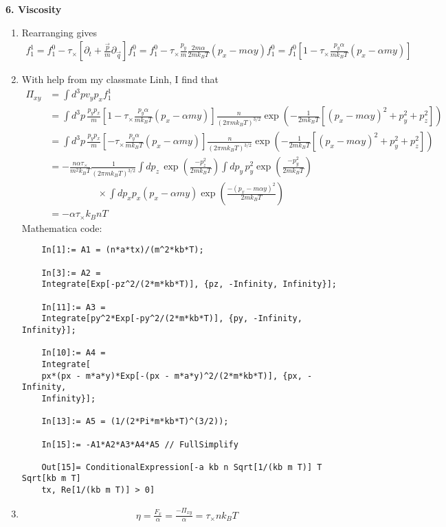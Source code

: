 \documentclass{article}
\theoremstyle{definition}
\newcommand{\p}{\partial}
\newcommand{\al}{\alpha}
\newcommand{\f}[2]{\frac{#1}{#2}}
\newcommand{\lp}{\left(}
\newcommand{\rp}{\right)}
\newcommand{\lb}{\left[}
\newcommand{\rb}{\right]}
\begin{document}
\noindent \textbf{6. Viscosity}

\begin{enumerate}[label=(\alph*)]
	\item Rearranging gives
	\begin{align*}
	\boxed{f_1^1} = f_1^0 - \tau_\times \lb \p_t + \f{\vec{p}}{m} \p_{\vec{q}} \rb f_1^0 = f_1^0 - \tau_\times \f{p_y}{m} \f{2m\al}{2mk_B T}(p_x - m\al y) f_1^0 = \boxed{f_1^0\lb 1 - \tau_\times \f{p_y \al}{ mk_B T}(p_x - \al m y) \rb}
	\end{align*}
	
	\item With help from my classmate Linh, I find that
	\begin{align*}
	\boxed{\Pi_{xy}} 
	&= \int d^3 p v_y p_x f_1^1 \\
	&= \int d^3 p \, \f{p_yp_x}{m} \lb 1 - \tau_\times \f{p_y \al}{ mk_B T}(p_x - \al m y) \rb \f{n}{(2\pi m k_B T)^{3/2}} \exp\lp -\f{1}{2mk_BT }\lb (p_x - m\al y)^2 + p_y^2 + p_z^2 \rb \rp \\
	&= \int d^3 p \, \f{p_yp_x}{m} \lb- \tau_\times \f{p_y \al}{ mk_B T}(p_x - \al m y) \rb \f{n}{(2\pi m k_B T)^{3/2}} \exp\lp -\f{1}{2mk_BT }\lb (p_x - m\al y)^2 + p_y^2 + p_z^2 \rb \rp \\
	&= -\f{n\al \tau_\times }{m^2 k_BT}\f{1}{(2\pi m k_B T)^{3/2}}\int dp_z\,\exp\lp \f{-p_z^2}{2mk_BT} \rp 
	\int d p_y \,p_y^2 \exp\lp \f{-p_y^2}{2mk_BT}\rp \\
	&\quad\quad\quad\quad\quad \times \int d p_x p_x(p_x - \al m y)\exp\lp \f{-(p_x-m\al y)^2}{2mk_BT}\rp \\
	&= \boxed{-\al \tau_\times k_B n T}
	\end{align*}
	Mathematica code:
	\begin{lstlisting}
	In[1]:= A1 = (n*a*tx)/(m^2*kb*T);
	
	In[3]:= A2 = 
	Integrate[Exp[-pz^2/(2*m*kb*T)], {pz, -Infinity, Infinity}];
	
	In[11]:= A3 = 
	Integrate[py^2*Exp[-py^2/(2*m*kb*T)], {py, -Infinity, Infinity}];
	
	In[10]:= A4 = 
	Integrate[
	px*(px - m*a*y)*Exp[-(px - m*a*y)^2/(2*m*kb*T)], {px, -Infinity, 
	Infinity}];
	
	In[13]:= A5 = (1/(2*Pi*m*kb*T)^(3/2));
	
	In[15]:= -A1*A2*A3*A4*A5 // FullSimplify
	
	Out[15]= ConditionalExpression[-a kb n Sqrt[1/(kb m T)] T Sqrt[kb m T]
	tx, Re[1/(kb m T)] > 0]
	\end{lstlisting}
	
	
	\item 
	\begin{align*}
	\boxed{\eta = \f{F_x}{\al} = \f{-\Pi_{xy}}{\al} = \tau_\times n k_B T}
	\end{align*}
\end{enumerate}
\end{document}
